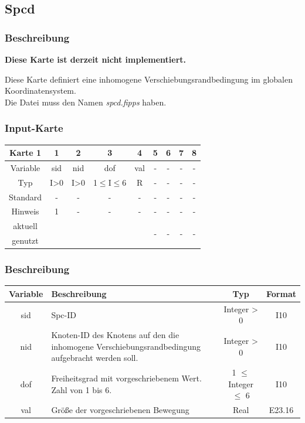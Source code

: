 \documentclass[11pt,titlepage,listof=totoc,bibliography=totoc,twoside]{scrreprt}
\begin{document}
{{\newpage

\subsection{Spcd}

\subsubsection{Beschreibung}

\textbf{Diese Karte ist derzeit nicht implementiert.}

Diese Karte definiert eine inhomogene Verschiebungsrandbedingung im globalen Koordinatensystem.\\
Die Datei muss den Namen \emph{spcd.fipps} haben.

\subsubsection{Input-Karte}

\begin{table}[htbp]
\centering
\begin{tabularx}{\textwidth}{cCCCCCCCC}
\toprule
Karte 1	& 1		& 2		& 3		& 4		& 5		& 6		& 7		& 8		\\
\midrule
Variable& sid		& nid		& dof		& val		& -		& -		& -		& -		\\
Typ	& I>0		& I>0		& 1$\le$I$\le$6	& R		& -		& -		& -		& -		\\
Standard& -		& -		& -		& -		& -		& -		& -		& -		\\
Hinweis	& 1		& -		& -		& -		& -		& -		& -		& -		\\
aktuell	& 	& 	& 	& 	& 	& \multirow{2}{*}{-}	& 	& 	\\
genutzt \\
\bottomrule
\end{tabularx}
\end{table}

\subsubsection{Beschreibung}

\begin{tabularx}{\textwidth}{cXcc}
\toprule
Variable& Beschreibung												& Typ				& Format\\
\midrule
sid	& Spc-ID												& Integer > 0			& I10	\\
nid	& Knoten-ID	des Knotens auf den die inhomogene Verschiebungsrandbedingung aufgebracht werden soll.	& Integer > 0			& I10	\\
dof	& Freiheitsgrad mit vorgeschriebenem Wert. Zahl von 1 bis 6.						& 1 $\le$ Integer  $\le$ 6	& I10	\\
val	& Größe der vorgeschriebenen Bewegung									& Real				& E23.16\\
\bottomrule
\end{tabularx}

}}
\end{document}
